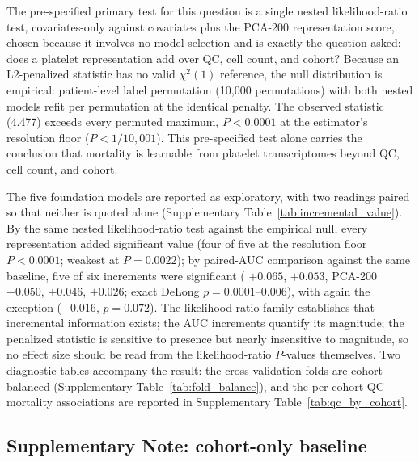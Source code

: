 The pre-specified primary test for this question is a single nested
likelihood-ratio test, covariates-only against covariates plus the PCA-200
representation score, chosen because it involves no model selection and is
exactly the question asked: does a platelet representation add over QC, cell
count, and cohort? Because an L2-penalized statistic has no valid $\chi^2(1)$
reference, the null distribution is empirical: patient-level label
permutation (10{,}000 permutations) with both nested models refit per
permutation at the identical penalty. The observed statistic (4.477) exceeds
every permuted maximum, $P < 0.0001$ at the estimator's resolution floor
($P < 1/10{,}001$). This pre-specified test alone carries the conclusion that
mortality is learnable from platelet transcriptomes beyond QC, cell count,
and cohort.

The five foundation models are reported as exploratory, with two readings
paired so that neither is quoted alone (Supplementary
Table~\ref{tab:incremental_value}). By the same nested likelihood-ratio test
against the empirical null, every representation added significant value
(four of five at the resolution floor $P < 0.0001$;  weakest at
$P = 0.0022$); by paired-AUC comparison against the same baseline, five of
six increments were significant ( $+0.065$, 
$+0.053$, PCA-200 $+0.050$,  $+0.046$, 
$+0.026$; exact DeLong $p = 0.0001$--$0.006$), with  again the
exception ($+0.016$, $p = 0.072$). The likelihood-ratio family establishes
that incremental information exists; the AUC increments quantify its
magnitude; the penalized statistic is sensitive to presence but nearly
insensitive to magnitude, so no effect size should be read from the
likelihood-ratio $P$-values themselves. Two diagnostic tables accompany the
result: the cross-validation folds are cohort-balanced (Supplementary
Table~\ref{tab:fold_balance}), and the per-cohort QC--mortality associations
are reported in Supplementary Table~\ref{tab:qc_by_cohort}.

\subsection{Supplementary Note: cohort-only baseline}
\label{sn:cohort_baseline}

